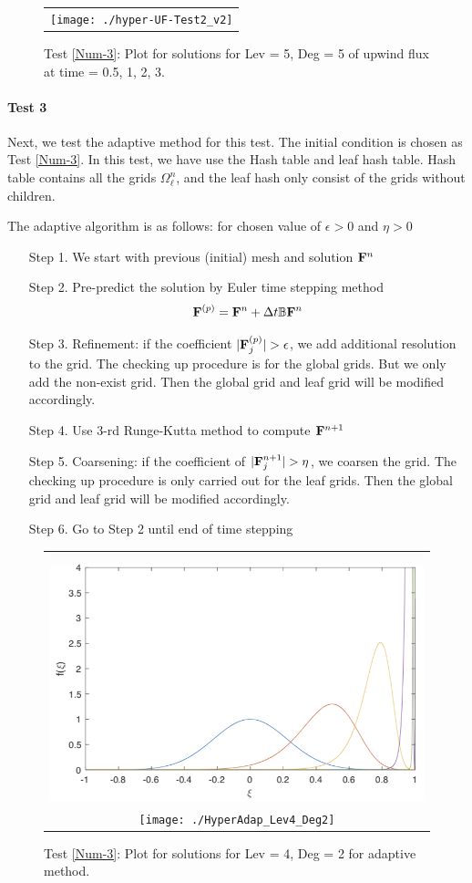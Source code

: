 \documentclass[final,leqno]{siamltex704}
\begin{document}
\begin{figure}
\centering
\begin{tabular}{c}
  \texttt{[image: ./hyper-UF-Test2\_v2]}
  \end{tabular}
\caption{Test \ref{Num-3}: Plot for solutions for Lev = 5, Deg = 5 of upwind flux at time = 0.5, 1, 2, 3.}
\end{figure}

\paragraph{Test 3}\label{Num-4}
Next, we test the adaptive method for this test. The initial condition is chosen as Test \ref{Num-3}. In this test, we have use the Hash table and leaf hash table. Hash table contains all the grids $\Omega^{n}_\ell$, and the leaf hash only consist of the grids without children. 

The adaptive algorithm is as follows: for chosen value of $\epsilon>0$ and $\eta>0$
\begin{itemize}
\item[Step 1.] We start with previous (initial) mesh and solution ${\bf F}^{n}$
\item[Step 2.] Pre-predict the solution by Euler time stepping method
$${\bf F}^{(p)} = {\bf F}^{n}+\Delta t \mathbb{B}{\bf F}^{n}$$
\item[Step 3.] Refinement: if the coefficient $|{\bf F}^{(p)}_j|>\epsilon$, we add additional resolution to the grid. The checking up procedure is for the global grids. But we only add the non-exist grid. Then the global grid and leaf grid will be modified accordingly.
\item[Step 4.] Use 3-rd Runge-Kutta method to compute ${\bf F}^{n+1}$
\item[Step 5.] Coarsening: if the coefficient of $|{\bf F}^{n+1}_j|>\eta$, we coarsen the grid. The checking up procedure is only carried out for the leaf grids. Then the global grid and leaf grid will be modified accordingly.
\item[Step 6.] Go to Step 2 until end of time stepping
\end{itemize}

\begin{figure}[H]
\centering
\begin{tabular}{c}
\includegraphics[width=.95\textwidth,height=.3\textwidth]{./Fig_notes/Fig2_note}\\
  \texttt{[image: ./HyperAdap\_Lev4\_Deg2]}
  \end{tabular}
\caption{Test \ref{Num-3}: Plot for solutions for Lev = 4, Deg = 2 for adaptive method.}
\end{figure}
\end{document}
